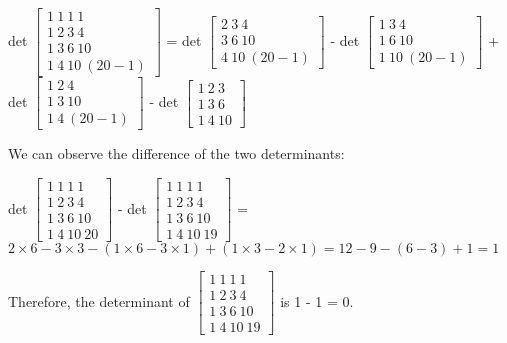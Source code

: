 \documentclass[11pt]{article}
\begin{document}
det \(\begin{bmatrix} 1 \ 1 \ 1 \ 1 \\ 1 \ 2 \ 3 \ 4 \\ 1 \ 3 \ 6 \ 10 \\ 1 \ 4 \ 10 \ (20-1) \end{bmatrix}\) = det \(\begin{bmatrix} 2 \ 3 \ 4 \\ 3 \ 6 \ 10 \\ 4 \ 10 \ (20-1) \end{bmatrix}\) - det \(\begin{bmatrix} 1 \ 3 \ 4 \\ 1 \ 6 \ 10 \\ 1 \ 10 \ (20-1) \end{bmatrix}\) + det \(\begin{bmatrix} 1 \ 2 \ 4 \\ 1 \ 3 \ 10 \\ 1 \ 4 \ (20-1) \end{bmatrix}\) - det \(\begin{bmatrix} 1 \ 2 \ 3 \\ 1 \ 3 \ 6 \\ 1 \ 4 \ 10 \end{bmatrix}\)

We can observe the difference of the two determinants:

det \(\begin{bmatrix} 1 \ 1 \ 1 \ 1 \\ 1 \ 2 \ 3 \ 4 \\ 1 \ 3 \ 6 \ 10 \\ 1 \ 4 \ 10 \ 20 \end{bmatrix}\) - det \(\begin{bmatrix} 1 \ 1 \ 1 \ 1 \\ 1 \ 2 \ 3 \ 4 \\ 1 \ 3 \ 6 \ 10 \\ 1 \ 4 \ 10 \ 19 \end{bmatrix}\) = \(2\times6 - 3\times3 - (1\times6 - 3\times1) + (1\times3 - 2\times1) = 12 - 9 - (6 - 3) + 1 = 1\)

Therefore, the determinant of \(\begin{bmatrix} 1 \ 1 \ 1 \ 1 \\ 1 \ 2 \ 3 \ 4 \\ 1 \ 3 \ 6 \ 10 \\ 1 \ 4 \ 10 \ 19 \end{bmatrix}\) is 1 - 1 = 0.
\end{document}
